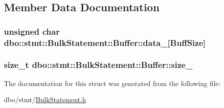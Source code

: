 \subsection{Member Data Documentation}
\hypertarget{structdbo_1_1stmt_1_1_bulk_statement_1_1_buffer_a6c9743244dbd2331d89b313eb011984d}{
\subsubsection[{data\+\_\+}]{\setlength{\rightskip}{0pt plus 5cm}unsigned char dbo\+::stmt\+::\+Bulk\+Statement\+::\+Buffer\+::data\+\_\+\mbox{[}{\bf Buff\+Size}\mbox{]}}}\label{structdbo_1_1stmt_1_1_bulk_statement_1_1_buffer_a6c9743244dbd2331d89b313eb011984d}
\hypertarget{structdbo_1_1stmt_1_1_bulk_statement_1_1_buffer_a5a80a63f64625964031eee534eb2c981}{
\subsubsection[{size\+\_\+}]{\setlength{\rightskip}{0pt plus 5cm}size\+\_\+t dbo\+::stmt\+::\+Bulk\+Statement\+::\+Buffer\+::size\+\_\+}}\label{structdbo_1_1stmt_1_1_bulk_statement_1_1_buffer_a5a80a63f64625964031eee534eb2c981}


The documentation for this struct was generated from the following file\+:\begin{DoxyCompactItemize}
\item 
dbo/stmt/\hyperlink{_bulk_statement_8h}{Bulk\+Statement.\+h}\end{DoxyCompactItemize}
